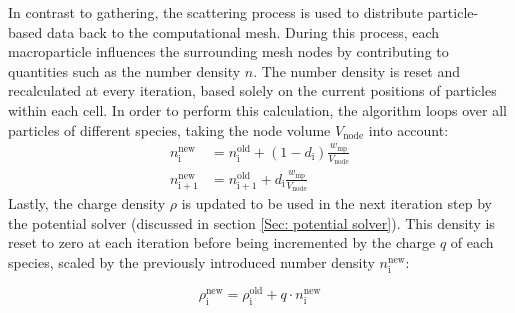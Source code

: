 In contrast to gathering, the scattering process is used to distribute particle-based data back to the computational mesh. During this process, each macroparticle influences the surrounding mesh nodes by contributing to quantities such as the number density $n$. The number density is reset and recalculated at every iteration, based solely on the current positions of particles within each cell. In order to perform this calculation, the algorithm loops over all particles of different species, taking the node volume $V_\mathrm{node}$ into account:
\begin{align}
    n_\mathrm{i}^{\mathrm{new}} &= n_\mathrm{i}^{\mathrm{old}} +  (1 - d_\mathrm{i}) \frac{w_\mathrm{mp}}{V_\mathrm{node}}\\
    n_\mathrm{i+1}^{\mathrm{new}} &= n_\mathrm{i+1}^{\mathrm{old}} + d_\mathrm{i} \frac{w_\mathrm{mp}}{V_\mathrm{node}}
\end{align}
Lastly, the charge density $\rho$ is updated to be used in the next iteration step by the potential solver (discussed in section \ref{Sec: potential solver}). This density is reset to zero at each iteration before being incremented by the charge $q$ of each species, scaled by the previously introduced number density $n_\mathrm{i}^\mathrm{new}$:

\begin{equation}
\rho_\mathrm{i}^\mathrm{new} = \rho_\mathrm{i}^\mathrm{old} + q \cdot n_\mathrm{i}^\mathrm{new}
\end{equation}


